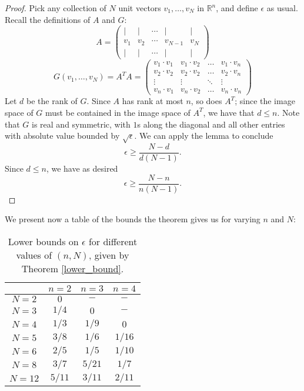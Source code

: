 \documentclass[11pt,letterpaper,twoside,english]{article}
\theoremstyle{theorem}
\theoremstyle{remark}
\begin{document}
\begin{proof}
Pick any collection of $N$ unit vectors $v_1,\ldots, v_N$ in $\mathbb R^n$, and define $\epsilon$ as usual. Recall the definitions of $A$ and $G$:
\[A=\left(\begin{matrix}
| & | & \cdots & | & |\\
v_1 & v_2 & \cdots & v_{N-1} & v_N\\
| & | & \cdots & | & | \end{matrix}\right)\] 
\[G(v_1,\ldots, v_N)=A^TA=\left(\begin{matrix}
v_1\cdot v_1 & v_1\cdot v_2 & \ldots & v_1\cdot v_n\\
v_2\cdot v_2 & v_2\cdot v_2 & \ldots & v_2\cdot v_n\\
\vdots & \vdots & \ddots & \vdots\\
v_n\cdot v_1 & v_n\cdot v_2 & \ldots & v_n\cdot v_n\end{matrix}\right)\]
Let $d$ be the rank of $G$. Since $A$ has rank at most $n$, so does $A^T$; since the image space of $G$ must be contained in the image space of $A^T$, we have that $d\leq n$. Note that $G$ is real and symmetric, with $1$s along the diagonal and all other entries with absolute value bounded by $\sqrt \epsilon$. We can apply the lemma to conclude
\[\epsilon\geq \frac{N-d}{d(N-1)}.\]
Since $d\leq n$, we have as desired
\[\epsilon\geq \frac{N-n}{n(N-1)}.\]
\end{proof}
We present now a table of the bounds the theorem gives us for varying $n$ and $N$:
\begin{table}[h]
   \centering
    \begin{tabular}{ | c | c | c | c |}
    \hline
      & $n=2$ & $n=3$ & $n=4$ \\ \hline
    $N=2$ & $0$ & $-$ & $-$ \\ \hline
    $N=3$ & $1/4$ & $0$ & $-$ \\ \hline
    $N=4$ & $1/3$ & $1/9$ & $0$ \\ \hline
    $N=5$ & $3/8$ & $1/6$ & $1/16$ \\ \hline
    $N=6$ & $2/5$ & $1/5$ & $1/10$ \\ \hline
    $N=8$ &  $3/7$ & $5/21$ & $1/7$ \\ \hline
    $N=12$ & $5/11$ & $3/11$ & $2/11$ \\
    \hline
    \end{tabular}
    \caption {Lower bounds on $\epsilon$ for different values of $(n, N)$, given by Theorem \ref{lower_bound}.}
    \end{table}
\end{document}
